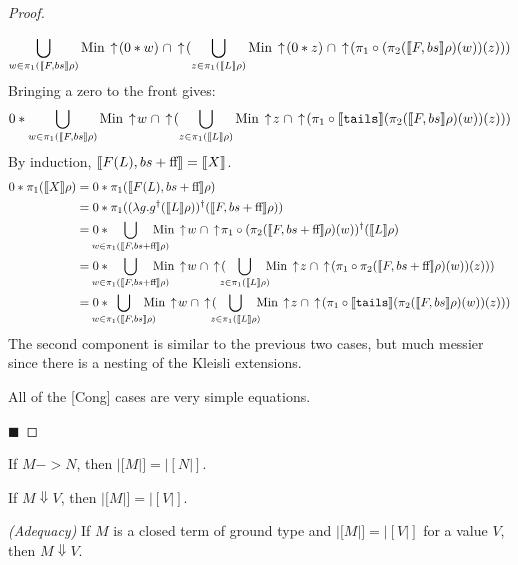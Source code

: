 \begin{proof}
\begin{description}
\begin{displaymath}
\bigcup_{w\in \pi_1(|[F,bs|]\rho)} \textrm{Min} \,\uparrow\! (0*w) \;\cap 
\,\uparrow\! (\bigcup_{z\in \pi_1(|[L|]\rho)} \textrm{Min} \,\uparrow\! (0*z) \;\cap 
\,\uparrow\! (\pi_1\circ (\pi_2 (|[F,bs|]\rho)(w))(z)))
\end{displaymath}
Bringing a zero to the front gives:
\begin{displaymath}
0 * \bigcup_{w\in \pi_1(|[F,bs|]\rho)} \textrm{Min} \,\uparrow\! w \;\cap 
\,\uparrow\! (\bigcup_{z\in \pi_1(|[L|]\rho)} \textrm{Min} \,\uparrow\! z \;\cap 
\,\uparrow\! (\pi_1\circ |[\texttt{tails}|](\pi_2 (|[F,bs|]\rho)(w))(z)))
\end{displaymath}
By induction, $|[F(L), bs+\textrm{ff }\!\!|] = |[X|]$.
\begin{align*}
0*\pi_1(|[X|]\rho) &= 0*\pi_1(|[F(L),bs+\false\!\!|]\rho) \\
&= 0*\pi_1((\lambda g.g^{\dagger}
(|[L|]\rho))^{\dagger}
(|[F,bs+\false\!\!|]\rho)) \\
&= 0*\!\!\!\!\!\!\!\!\!\bigcup_{w\in \pi_1(|[F,bs+\false\!\!|]\rho)}\!\!\!\!\!\!\!\!\!
\Min \ua w \;\cap \ua \pi_1 \circ 
(\pi_2(|[F,bs+\false\!\!|]\rho)(w))^{\dagger}(|[L|]\rho) \\
&= 0*\!\!\!\!\!\!\!\!\!\bigcup_{w\in \pi_1(|[F,bs+\false\!\!|]\rho)}\!\!\!\!\!\!\!\!\!
\Min \ua w \;\cap \ua
(\!\!\!\bigcup_{z\in \pi_1(|[L|]\rho)}\!\!\! \Min \ua z \;\cap \ua
(\pi_1 \circ \pi_2(|[F,bs+\false\!\!|]\rho)(w))(z))) \\
&= 0*\!\!\!\!\!\!\!\!\!\bigcup_{w\in \pi_1(|[F,bs|]\rho)}\!\!\!\!\!\!\!
\Min \ua w \;\cap \ua
(\!\!\!\bigcup_{z\in \pi_1(|[L|]\rho)}\!\!\! \Min \ua z \;\cap \ua
(\pi_1 \circ |[\texttt{tails}|](\pi_2(|[F,bs|]\rho)(w))(z)))
\end{align*}
The second component is similar to the previous two cases, but much messier since there is a nesting of the Kleisli extensions.

All of the [Cong] cases are very simple equations.
\end{description}
\hfill $\blacksquare$
\end{proof}

\begin{corollary}
If $M->N$, then $|[M|] = |[N|]$.
\end{corollary}

\begin{corollary}
If $M\Downarrow V$, then $|[M|] = |[V|]$.
\end{corollary}

\begin{theorem}
\emph{(Adequacy)} If $M$ is a closed term of ground type and $|[M|] = |[V|]$ for a value $V$, then $M\Downarrow V$.
\end{theorem}

